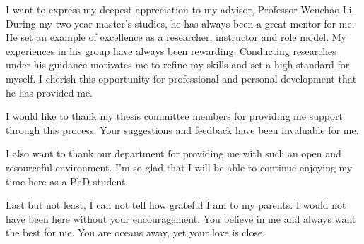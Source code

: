 I want to express my deepest appreciation to my advisor, Professor Wenchao Li.
During my two-year master's studies, he has always been a great mentor for me. 
He set an example of excellence as a researcher, instructor and role model.
My experiences in his group have always been rewarding. 
Conducting researches under his guidance motivates me to refine my skills and set a high standard for myself. 
I cherish this opportunity for professional and personal development that he has provided me.

I would like to thank my thesis committee members for providing me support through this process. 
Your suggestions and feedback have been invaluable for me.

I also want to thank our department for providing me with such an open and resourceful environment. 
I'm so glad that I will be able to continue enjoying my time here as a PhD student.

Last but not least, I can not tell how grateful I am to my parents.
I would not have been here without your encouragement. You believe in me and always want the best for me.
You are oceans away, yet your love is close.

\vskip 1in
